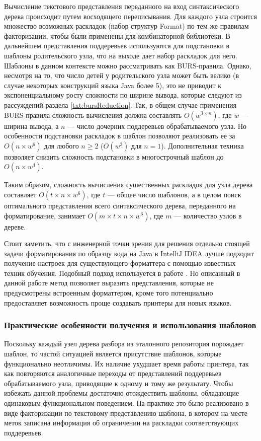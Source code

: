 Вычисление текстового представления переданного на вход синтаксического
дерева происходит путем восходящего переписывания. Для каждого узла строится множество
возможных раскладок (набор структур Format) по тем же правилам факторизации, чтобы были
применены для комбинаторной библиотеки. В дальнейшем представления поддеревьев
используются для подстановки в шаблоны родительского узла, что на выходе дает
набор раскладок для него. Шаблоны в данном контексте можно рассматривать как
BURS-правила. Однако, несмотря на то, что число детей у родительского узла может
быть велико (в случае некоторых конструкций языка Java более 5),
это не приводит к экспоненциальному росту сложности по ширине вывода, которые
следуют из рассуждений раздела \ref{txt:bursReduction}. Так, в общем случае применения
BURS-правила сложность вычисления должна составлять $O(w^{3 \times n})$, где $w$ ---
ширина вывода, а $n$ --- число дочерних поддеревьев обрабатываемого узла. Но
особенности подстановки раскладок в шаблон позволяют реализовать ее
за $O(n \times w^{6})$ для любого $n \geq 2$ ($O(w^{3})$ для $n = 1$).
Дополнительная техника позволяет снизить сложность подстановки в многострочный шаблон
до $O(n \times w^{4})$.

Таким образом, сложность вычисления сушественных раскладок для узла дерева
составляет $O(t \times n \times w^{6})$, где $t$ --- общее число шаблонов,
а в целом поиск оптимального представления всего синтаксического дерева, переданного
на форматирование, занимает $O(m \times t \times n \times w^{6})$, где $m$
--- количество узлов в дереве.


Стоит заметить, что с инженерной точки зрения для решения отдельно стоящей задачи
форматирования по образцу кода на Java в IntelliJ IDEA лучше подходит
получение настроек для существующего форматтера с помощью известных техник обучения.
Подобный подход используется в работе \cite{learning}.
Но описанный в данной работе метод позволяет выразить представления, которые не
предусмотрены встроенным форматтером, кроме того потенциально предоставляет
возможность проще создавать принтеры для новых языков. 

\newpage
\subsubsection{Практические особенности получения и использования шаблонов}

Поскольку каждый узел дерева разбора из эталонного репозитория порождает
шаблон, то частой ситуацией является присутствие шаблонов, которые функционально
неотличимы. Их наличие ухудшает время работы принтера, так как повторяются
аналогичные переходы от представлений поддеревьев обрабатываемого узла, приводящие
к одному и тому же результату. Чтобы избежать данной проблемы достаточно
отождествить шаблоны, обладающие одинаковым функциональном поведением.
На практике это было реализовано в виде факторизации по текстовому представлению
шаблона, в котором на месте меток записана информация об ограничении на раскладки
соответствующих поддеревьев.

